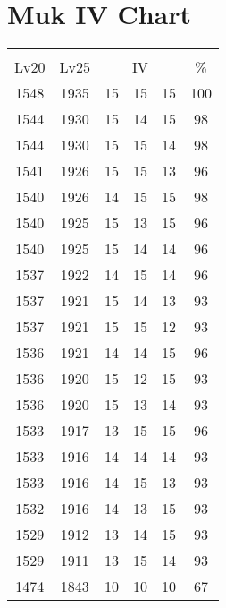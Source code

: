 \documentclass{article}%
\begin{document}
%
\normalsize%
\section{Muk IV Chart}%
\label{sec:Muk IV Chart}%
\renewcommand{\arraystretch}{1.5}%
\begin{tabular}{|c|c|c|c|c|c|}%
\hline%
\multicolumn{6}{|c|}{\textcolor{white}{ 
\linebreak{Muk}
}%
\cellcolor{black}}\\%
\multicolumn{1}{|c}{Lv20}&\multicolumn{1}{c|}{Lv25}&\multicolumn{3}{c|}{IV}&\multicolumn{1}{|c|}{\%}\\%
\hline%
\rowcolor{color100}%
1548&1935&15&15&15&100\\%
\hline%
\rowcolor{color98}%
1544&1930&15&14&15&98\\%
\hline%
\rowcolor{color98}%
1544&1930&15&15&14&98\\%
\hline%
\rowcolor{color96}%
1541&1926&15&15&13&96\\%
\hline%
\rowcolor{color98}%
1540&1926&14&15&15&98\\%
\hline%
\rowcolor{color96}%
1540&1925&15&13&15&96\\%
\hline%
\rowcolor{color96}%
1540&1925&15&14&14&96\\%
\hline%
\rowcolor{color96}%
1537&1922&14&15&14&96\\%
\hline%
\rowcolor{color93}%
1537&1921&15&14&13&93\\%
\hline%
\rowcolor{color93}%
1537&1921&15&15&12&93\\%
\hline%
\rowcolor{color96}%
1536&1921&14&14&15&96\\%
\hline%
\rowcolor{color93}%
1536&1920&15&12&15&93\\%
\hline%
\rowcolor{color93}%
1536&1920&15&13&14&93\\%
\hline%
\rowcolor{color96}%
1533&1917&13&15&15&96\\%
\hline%
\rowcolor{color93}%
1533&1916&14&14&14&93\\%
\hline%
\rowcolor{color93}%
1533&1916&14&15&13&93\\%
\hline%
\rowcolor{color93}%
1532&1916&14&13&15&93\\%
\hline%
\rowcolor{color93}%
1529&1912&13&14&15&93\\%
\hline%
\rowcolor{color93}%
1529&1911&13&15&14&93\\%
\hline%
\rowcolor{color91}%
1474&1843&10&10&10&67\\%
\end{tabular}

%
\end{document}
